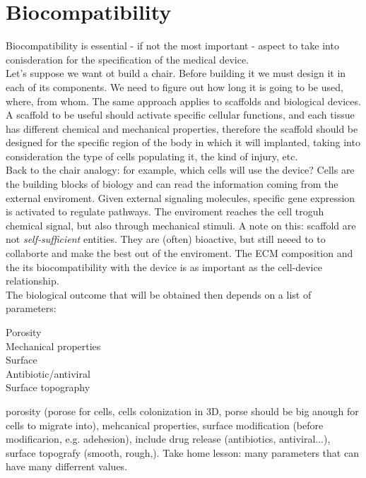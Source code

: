 \chapter{Biocompatibility}
Biocompatibility is essential - if not the most important - aspect to take into conisderation for the specification of the medical device. 
\\
Let's suppose we want ot build a chair. Before building it we must design it in each of its components. We need to figure out how long it is going to be used, where, from whom. The same approach applies to scaffolds and biological devices. A scaffold to be useful should activate specific cellular functions, and each tissue has different chemical and mechanical properties, therefore the scaffold should be designed for the specific region of the body in which it will implanted, taking into consideration the type of cells populating it, the kind of injury, etc.
\\
Back to the chair analogy: for example, which cells will use the device? Cells are the building blocks of biology and can read the information coming from the external enviroment. Given external signaling molecules, specific gene expression is activated to regulate pathways. The enviroment reaches the cell troguh chemical signal, but also through mechanical stimuli. A note on this: scaffold are not \textit{self-sufficient} entities. They are (often) bioactive, but still neeed to to collaborte and make the best out of the enviroment. The ECM composition and the its biocompatibility with the device is as important as the cell-device relationship. 
\\
The biological outcome that will be obtained then depends on a list of parameters:
\begin{description}
\item[Porosity]
\item[Mechanical properties]
\item[Surface]
\item[Antibiotic/antiviral]
\item[Surface topography]
\end{description}
porosity (porose for cells, cells colonization in 3D, porse should be big anough for cells to migrate into), mehcanical properties, surface modification (before modificarion, e.g. adehesion), include drug release (antibiotics, antiviral...), surface topografy (smooth, rough,). Take home lesson: many parameters that can have many differrent values. 